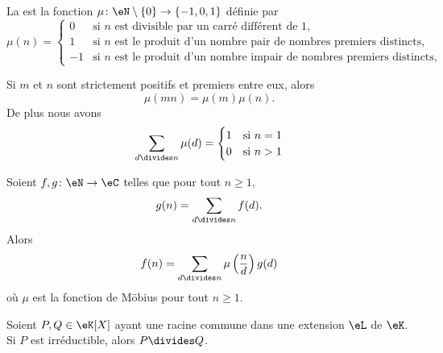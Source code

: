 \begin{definition}  \label{DefWXBkOxg}
	La  est la fonction \( \mu\colon \eN\setminus\{ 0 \}\to \{ -1,0,1 \}\) définie par
	\begin{equation}
		\mu(n)=\begin{cases}
			0  & \text{si } n\text{ est divisible par un carré différent de } 1\text{,}               \\
			1  & \text{si } n\text{ est le produit d'un nombre pair de nombres premiers distincts,}   \\
			-1 & \text{si } n\text{ est le produit d'un nombre impair de nombres premiers distincts,}
		\end{cases}
	\end{equation}
\end{definition}

\begin{proposition}     \label{PROPooOVYJooFvmxyj}
	Si \( m\) et \( n\) sont strictement positifs et premiers entre eux, alors
	\begin{equation}
		\mu(mn)=\mu(m)\mu(n).
	\end{equation}
	De plus nous avons
	\begin{equation}
		\sum_{d\divides n}\mu(d)=\begin{cases}
			1 & \text{si } n=1 \\
			0 & \text{si } n>1
		\end{cases}
	\end{equation}
\end{proposition}

\begin{proposition}    \label{PropLBZoIoO}
	Soient \( f,g\colon \eN\to \eC\) telles que pour tout \( n\geq 1\),
	\begin{equation}
		g(n)=\sum_{d\divides n}f(d).
	\end{equation}
	Alors
	\begin{equation}
		f(n)=\sum_{d\divides n}\mu\left( \frac{ n }{ d } \right)g(d)
	\end{equation}
	où \( \mu\) est la fonction de Möbius pour tout \( n\geq 1\).
\end{proposition}

\begin{lemma}   \label{LemRGuWqNu}
	Soient \( P,Q\in \eK[X]\) ayant une racine commune dans une extension \( \eL\) de \( \eK\). Si \( P\) est irréductible, alors \( P\divides Q\).
\end{lemma}

